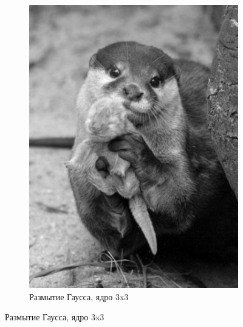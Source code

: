 \begin{figure}[ht!]
\begin{subfigure}[b]{0.5\linewidth}
        \includegraphics[width=0.95\linewidth]{gaussian_3.png}
        \caption{Размытие Гаусса, ядро 3x3}
    \end{subfigure}


\end{figure}
